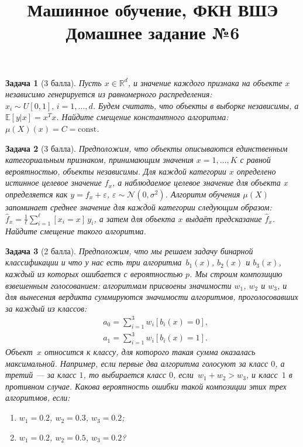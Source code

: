\documentclass[12pt,fleqn]{article}
\title{Машинное обучение, ФКН ВШЭ\\Домашнее задание №6}
\author{}
\date{}
\newtheorem{esProblem}{Задача}
\begin{document}
    \maketitle
    
    \begin{esProblem}[3 балла]
        Пусть $x \in \mathbb{R}^d$, и значение каждого признака на объекте $x$ независимо генерируется из равномерного распределения: $x_i \sim U[0, 1], \, i = 1, \dots, d$. Будем считать, что объекты в выборке независимы, а $\mathbb{E}[y|x] = x^T x$. Найдите смещение константного алгоритма: $\mu(X)(x) = C = \text{const}$.    
        
    \end{esProblem}
    
    \begin{esProblem}[3 балла]
         Предположим, что объекты описываются единственным категориальным признаком, принимающим значения $x = 1, \dots, K$ с равной вероятностью, объекты независимы. Для каждой категории $x$ определено истинное целевое значение $f_x$, а наблюдаемое целевое значение для объекта x определяется как $y = f_x + \varepsilon$, $\varepsilon \sim \mathcal{N}(0, \sigma^2)$. Алгоритм обучения $\mu(X)$ запоминает среднее значение для каждой категории следующим образом: $\hat f_x = \frac 1 \ell \sum_{i=1}^\ell [x_i=x] \, y_i$, а затем для объекта $x$ выдаёт предсказание $\hat f_x$. Найдите смещение такого алгоритма.
        
    \end{esProblem}
    
    \begin{esProblem}[2 балла]
       Предположим, что мы решаем задачу бинарной классификации и что у нас есть три алгоритма~$b_1(x)$, $b_2(x)$ и $b_3(x)$,
        каждый из которых ошибается с вероятностью $p$.
        Мы строим композицию взвешенным голосованием: алгоритмам присвоены значимости $w_1$, $w_2$ и $w_3$,
        и для вынесения вердикта суммируются значимости алгоритмов, проголосовавших за каждый из классов:
        \begin{align*}
            &a_0 = \sum_{i = 1}^{3} w_i [b_i(x) = 0],\\
            &a_1 = \sum_{i = 1}^{3} w_i [b_i(x) = 1].
        \end{align*}
        Объект~$x$ относится к классу, для которого такая сумма оказалась максимальной.
        Например, если первые два алгоритма голосуют за класс $0$,
        а третий --- за класс $1$, то выбирается класс $0$, если~$w_1 + w_2 > w_3$, и класс~$1$ в противном случае.
        Какова вероятность ошибки такой композиции этих трех алгоритмов, если:
        \begin{enumerate}
            \item $w_1 = 0.2$, $w_2 = 0.3$, $w_3 = 0.2$;
            \item $w_1 = 0.2$, $w_2 = 0.5$, $w_3 = 0.2$?
        \end{enumerate}

    \end{esProblem}
\end{document}
